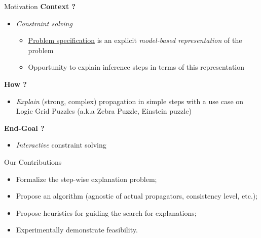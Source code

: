 \documentclass[handout]{beamer}
\begin{document}
\begin{frame}{Motivation}
    \vfill
    \textbf{Context ?}
    \begin{itemize}
        \item \textit{Constraint solving}
              \begin{itemize}
                  \item \underline{Problem specification} is an explicit \emph{model-based representation} of the problem
                  \item Opportunity to explain inference steps in terms of this representation
              \end{itemize}
    \end{itemize}\pause
    \vfill
    \textbf{How ?}
    \begin{itemize}
        \item \emph{Explain} (strong, complex) propagation in simple steps with a use case on Logic Grid Puzzles (a.k.a Zebra Puzzle, Einstein puzzle)\pause
    \end{itemize}
    \vfill
    \textbf{End-Goal ?}
    \begin{itemize}
        \item \emph{Interactive} constraint solving
    \end{itemize}

    \vfill

\end{frame}



\begin{frame}{Our Contributions}

    \begin{itemize}
        \item Formalize the step-wise explanation problem;
        \item Propose an algorithm (agnostic of actual propagators, consistency level, etc.);
        \item Propose heuristics for guiding the search for explanations;
        \item Experimentally demonstrate feasibility.
    \end{itemize}
\end{frame}
\end{document}
